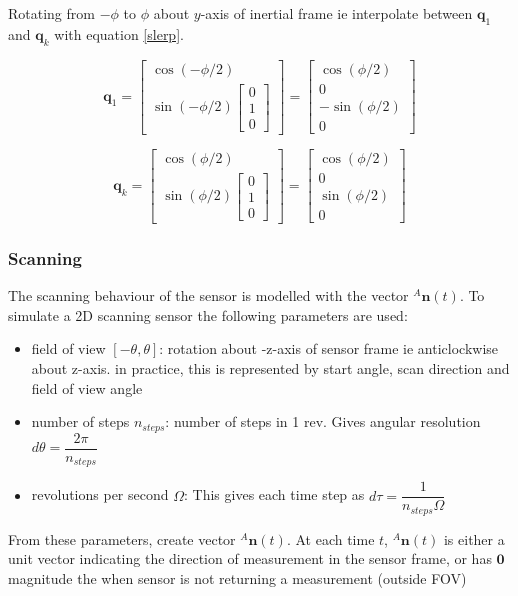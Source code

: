 													
Rotating from $-\phi$ to $\phi$ about $y$-axis of inertial frame ie interpolate between $\mathbf{q}_1$ and $\mathbf{q}_k$ with equation \ref{slerp}.
	
\begin{equation}
	\mathbf{q}_1 = \begin{bmatrix}
				 	\cos(-\phi/2) \\
				 	\sin(-\phi/2){\begin{bmatrix}
								 	0 \\ 1 \\ 0
							   	 \end{bmatrix}}
				 \end{bmatrix}
				 = \begin{bmatrix}
		 		   		\cos(\phi/2) \\ 0 \\ -\sin(\phi/2) \\ 0
				   \end{bmatrix}
\end{equation}

\begin{equation}
	\mathbf{q}_k = \begin{bmatrix}
				 	\cos(\phi/2) \\
				 	\sin(\phi/2){\begin{bmatrix}
								 	0 \\ 1 \\ 0
							   	 \end{bmatrix}}
				 \end{bmatrix}
				 = \begin{bmatrix}
		 		   		\cos(\phi/2) \\ 0 \\ \sin(\phi/2) \\ 0
				   \end{bmatrix}
\end{equation}

\subsubsection{Scanning}
The scanning behaviour of the sensor is modelled with the vector ${^{A}\mathbf{n}(t)}$.
To simulate a 2D scanning sensor the following parameters are used:
\begin{itemize}
\item field of view $[-\theta,\theta]$: rotation about -z-axis of sensor frame ie anticlockwise about z-axis. in practice, this is represented by start angle, scan direction and field of view angle
\item number of steps $n_{steps}$: number of steps in 1 rev. Gives angular resolution $d\theta = \dfrac{2\pi}{n_{steps}}$
\item revolutions per second $\Omega$: This gives each time step as $d\tau = \dfrac{1}{n_{steps}\Omega}$
\end{itemize}
From these parameters, create vector ${^{A}\mathbf{n}(t)}$. At each time $t$, ${^{A}\mathbf{n}(t)}$ is either a unit vector indicating the direction of measurement in the sensor frame, or has $\mathbf{0}$ magnitude the when sensor is not returning a measurement (outside FOV)

